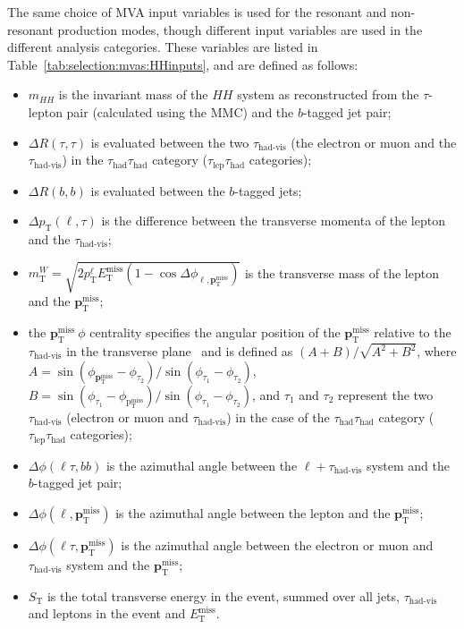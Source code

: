 The same choice of MVA input variables is used for the resonant and non-resonant production modes, though different input variables are used in the different analysis categories. These variables are listed in Table~\ref{tab:selection:mvas:HHinputs}, and are defined as follows:
\begin{itemize}
\item $m_{HH}$ is the invariant mass of the $HH$ system as reconstructed from the $\tau$-lepton pair (calculated using the MMC) and the $b$-tagged jet pair;
\item $\Delta R(\tau, \tau)$ is evaluated between the two $\tau_\text{had-vis}$ (the electron or muon and the $\tau_\text{had-vis}$) in the $\tau_\text{had}\tau_\text{had}$ category ($\tau_\text{lep}\tau_\text{had}$ categories);
\item $\Delta R(b, b)$ is evaluated between the $b$-tagged jets;
\item $\Delta p_\text{T}(\ell, \tau)$ is the difference between the transverse momenta of the lepton and the $\tau_\text{had-vis}$;
\item $m_\text{T}^W =\sqrt{2p_\text{T}^\ell E_\text{T}^\text{miss}(1-\cos\Delta\phi_{\ell,\mathbf{p}_\text{T}^\text{miss}})}$ is the transverse mass of the lepton and the $\mathbf{p}_\text{T}^\text{miss}$;

\item the $\mathbf{p}_\text{T}^\text{miss}~\phi$ centrality specifies the angular position of the $\mathbf{p}_\text{T}^{\text{miss}}$ relative to the $\tau_\text{had-vis}$ in the transverse plane~\cite{HIGG-2013-32} and is defined as $(A+B)/\sqrt{A^2+B^2}$, where $A=\sin(\phi_{\mathbf{p}_\text{T}^\text{miss}}-\phi_{\tau_2})/\sin(\phi_{\tau_1}-\phi_{\tau_2})$, $B=\sin(\phi_{\tau_1}-\phi_{\mathrm{p}_\text{T}^\text{miss}})/\sin(\phi_{\tau_1}-\phi_{\tau_2})$, and $\tau_1$ and $\tau_2$ represent the two $\tau_\text{had-vis}$ (electron or muon and $\tau_\text{had-vis}$) in the case of the $\tau_\text{had}\tau_\text{had}$ category ($\tau_\text{lep}\tau_\text{had}$ categories);

\item $\Delta\phi(\ell\tau, bb)$ is the azimuthal angle between the $\ell+\tau_\text{had-vis}$ system and the $b$-tagged jet pair;
\item $\Delta\phi(\ell, \mathbf{p}_\text{T}^\text{miss})$ is the azimuthal angle between the lepton and the $\mathbf{p}_\text{T}^\text{miss}$;
\item $\Delta\phi(\ell\tau, \mathbf{p}_\text{T}^\text{miss})$ is the azimuthal angle between the electron or muon and $\tau_\text{had-vis}$ system and the $\mathbf{p}_\text{T}^\text{miss}$;
\item $S_\text{T}$ is the total transverse energy in the event, summed over all jets, $\tau_\text{had-vis}$ and leptons in the event and $E_\text{T}^\text{miss}$.%
\end{itemize}
